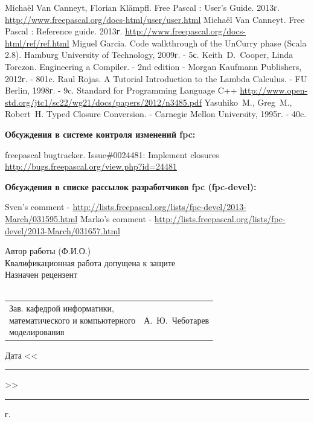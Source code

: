 \documentclass{imcs}
\begin{document}
\begin{thebibliography}{99}
 Michaël Van Canneyt, Florian Klämpfl. Free Pascal : User’s Guide. 2013г. \url{http://www.freepascal.org/docs-html/user/user.html}
 Michaël Van Canneyt. Free Pascal : Reference guide. 2013г. \url{http://www.freepascal.org/docs-html/ref/ref.html}
 Miguel Garcia. Code walkthrough of the UnCurry phase (Scala 2.8). Hamburg University of Technology, 2009г. - 5с.
 Keith~D.~Cooper, Linda Torczon. Engineering a Compiler. - 2nd edition - Morgan Kaufmann Publishers, 2012г. - 801c.
 Raul Rojas. A Tutorial Introduction to the Lambda Calculus. - FU Berlin, 1998г. - 9c.
 Standard for Programming Language C++ \url{http://www.open-std.org/jtc1/sc22/wg21/docs/papers/2012/n3485.pdf}
 Yasuhiko~M., Greg~M., Robert~H. Typed  Closure Conversion. - Carnegie Mellon University, 1995г. - 40c.

  
{\bf Обсуждения в системе контроля изменений fpc:}  
  
 freepascal bugtracker. Issue\#0024481: Implement closures \url{http://bugs.freepascal.org/view.php?id=24481}
  
{\bf Обсуждения в списке рассылок разработчиков fpc (fpc-devel):}

 Sven's comment - \url{http://lists.freepascal.org/lists/fpc-devel/2013-March/031595.html}
 Marko's comment - \url{http://lists.freepascal.org/lists/fpc-devel/2013-March/031657.html}


  
\end{thebibliography}

\pagebreak

\noindent Автор работы  (Ф.И.О.)\\

\noindent{}Квалификационная работа допущена к защите\\

\noindent{}Назначен рецензент\\
\\

\vspace{2\baselineskip}
\noindent\begin{tabular}{p{} p{}}
\parbox{8cm}{Зав. кафедрой информатики,\\ математического и компьютерного\\ моделирования} &
\hfill А.~Ю.~Чеботарев\\
\end{tabular}
\vspace{2\baselineskip}
\begin{flushright}
Дата <<\rule{1cm}{0.5pt}>>\rule{3cm}{0.5pt} г.
\end{flushright}
\end{document}

